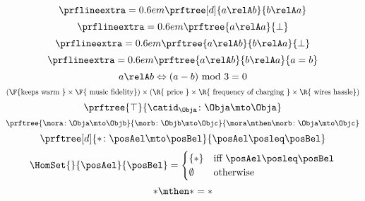 {\begin{forslides}
\begin{equation*}
    \label{eq:rel_sym}
    \prflineextra=0.6em
    \prftree[d]{a \relA b}{b\relA a}
\end{equation*}
\begin{equation*}
    \label{eq:rel_irr}
    \prflineextra=0.6em
    \prftree{a \relA a}{\bot}
\end{equation*}
\begin{equation*}
    \label{eq:rel_asy}
    \prflineextra=0.6em
    \prftree{a \relA b}{b\relA a}{\bot}
\end{equation*}
\begin{equation*}
    \label{eq:rel_antisy}
    \prflineextra=0.6em
    \prftree{a \relA b}{b\relA a}{a=b}
\end{equation*}
    \begin{equation*}
    \label{eq:ex}
    a\relA b \Leftrightarrow (a-b) \text{ mod }3=0
\end{equation*}
    \begin{equation*}
        \label{eq:fun_cost}
        (\F{\text{keeps warm }}\times \F{\text{ music fidelity}})\times(\R{\text{ price }} \times \R{\text{ frequency of charging }}\times \R{\text{ wires hassle}})
\end{equation*}
    \begin{equation*}
        \label{eq:id_ex}
        \prftree{\top}{\catid_\Obja\colon \Obja \mto \Obja}
\end{equation*}
\begin{equation*}
\label{eq:comp_cat}
\prftree{\mora \colon \Obja \mto \Objb}{\morb\colon \Objb \mto \Objc}{\mora\mthen \morb \colon \Obja \mto \Objc}
\end{equation*}
\begin{equation*}
\label{eq:mor_pre}
\prftree[d]{\ast\colon \posAel \mto \posBel}{\posAel \posleq \posBel}
\end{equation*}
\begin{equation*}
\label{eq:hom_pre}
\HomSet{}{\posAel}{\posBel}=\begin{cases}\{\ast\} &\text{iff } \posAel \posleq \posBel\\
\emptyset &\text{otherwise}\end{cases}
\end{equation*}
 \begin{equation*}
\label{eq:comp_pre}
\ast \mthen \ast = \ast
\end{equation*}
 \begin{equation*}
\label{eq:ex_pre}
\begin{aligned}

\end{aligned}
\end{equation*}
\end{forslides}}
